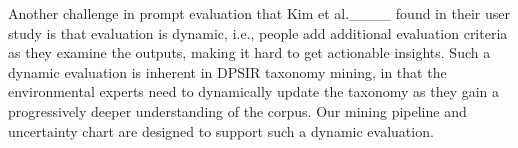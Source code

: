 Another challenge in prompt evaluation that Kim et al.____ found in their user study is that evaluation is dynamic, i.e., people add additional evaluation criteria as they examine the outputs, making it hard to get actionable insights. Such a dynamic evaluation is inherent in DPSIR taxonomy mining, in that the environmental experts need to dynamically update the taxonomy as they gain a progressively deeper understanding of the corpus.
Our mining pipeline and uncertainty chart are designed to support such a dynamic evaluation.